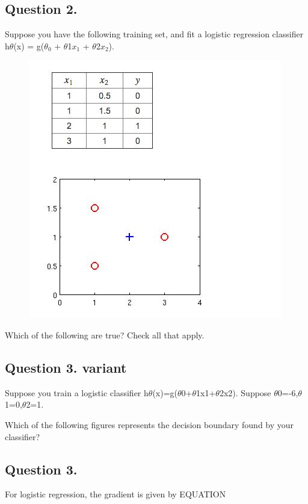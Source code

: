 \documentclass[11pt]{article} %
\begin{document}

	
	\subsection*{Question 2. }
	Suppose you have the following training set, and fit a logistic regression classifier h$\theta$(x) = g($\theta_0$ + $\theta$1$x_1$ + $\theta$2$x_2$).
	
	\begin{figure}[h!]
\centering
\includegraphics[width=0.6\linewidth]{Week3-Quiz-1}

\end{figure}

	
	Which of the following are true? Check all that apply.
	
	\subsection{Question 3. variant
		}
	Suppose you train a logistic classifier h$\theta$(x)=g($\theta$0+$\theta$1x1+$\theta$2x2). 
	Suppose $\theta$0=-6,$\theta$1=0,$\theta$2=1. 
	
	Which of the following figures represents the decision boundary found by your classifier?
	
	\subsection*{Question 3. }
	For logistic regression, the gradient is given by EQUATION
	
\end{document}
